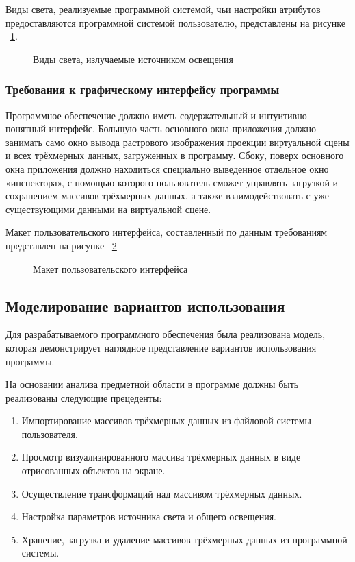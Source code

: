 Виды света, реализуемые программной системой, чьи настройки атрибутов предоставляются программной системой пользователю, представлены на рисунке ~\ref{diagram8:image}.

\begin{figure}[ht]
	\caption{Виды света, излучаемые источником освещения}
	\label{diagram8:image}
\end{figure}

\subsubsection{Требования к графическому интерфейсу программы}

Программное обеспечение должно иметь содержательный и интуитивно понятный интерфейс. Большую часть основного окна приложения должно занимать само окно вывода растрового изображения проекции виртуальной сцены и всех трёхмерных данных, загруженных в программу. Сбоку, поверх основного окна приложения должно находиться специально выведенное отдельное окно «инспектора», с помощью которого пользователь сможет управлять загрузкой и сохранением массивов трёхмерных данных, а также взаимодействовать с уже существующими данными на виртуальной сцене.

Макет пользовательского интерфейса, составленный по данным требованиям представлен на рисунке ~\ref{maket1:image}

\begin{figure}[H]
	\caption{Макет пользовательского интерфейса}
	\label{maket1:image}
\end{figure}

\subsection{Моделирование вариантов использования}

Для разрабатываемого программного обеспечения была реализована модель, которая демонстрирует наглядное представление вариантов использования программы.

На основании анализа предметной области в программе должны быть реализованы следующие прецеденты:
\begin{enumerate}
\item Импортирование массивов трёхмерных данных из файловой системы пользователя.
\item Просмотр визуализированного массива трёхмерных данных в виде отрисованных объектов на экране.
\item Осуществление трансформаций над массивом трёхмерных данных.
\item Настройка параметров источника света и общего освещения.
\item Хранение, загрузка и удаление массивов трёхмерных данных из программной системы.
\end{enumerate}

